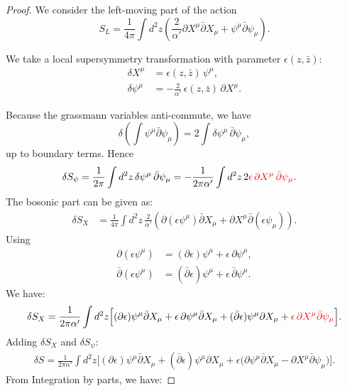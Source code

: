 \begin{tcolorbox}[breakable]
\begin{proof}
		We consider the left-moving part of the action
		\begin{equation}
			S_L=\frac{1}{4\pi}\int d^2z\left(\frac{2}{\alpha'}\partial X^\mu \bar\partial X_\mu+\psi^\mu\bar\partial\psi_\mu\right).
		\end{equation}
		
		We take a local supersymmetry transformation with parameter $\epsilon(z,\bar z)$:
		\begin{align}
			\delta X^\mu &= \epsilon(z,\bar z)\,\psi^\mu, \\
			\delta \psi^\mu &= -\frac{2}{\alpha'}\,\epsilon(z,\bar z)\,\partial X^\mu.
		\end{align}

		Because the grassmann variables anti-commute, we have
		\begin{equation}
			\delta\!\left(\int \psi^\mu \bar\partial \psi_\mu\right)
			= 2 \int \delta\psi^\mu\,\bar\partial \psi_\mu,
		\end{equation}
		up to boundary terms. Hence
		\begin{align}
			\delta S_\psi
			&= \frac{1}{2\pi}\int d^2z\, \delta\psi^\mu\,\bar\partial \psi_\mu= -\frac{1}{2\pi\alpha'}\int d^2z\, 2\mathcolor{red}{\epsilon\,\partial X^\mu\,\bar\partial \psi_\mu}.
		\end{align}
		The bosonic part can be given as:
		\begin{align}
			\delta S_X
			&= \frac{1}{4\pi}\int d^2z\,\frac{2}{\alpha'}
			\left(\partial(\epsilon\psi^\mu)\bar\partial X_\mu + \partial X^\mu \bar\partial(\epsilon\psi_\mu)\right).
		\end{align}
		Using
		\begin{align}
			\partial(\epsilon\psi^\mu) &= (\partial \epsilon)\psi^\mu + \epsilon\,\partial \psi^\mu, \\
			\bar\partial(\epsilon\psi^\mu) &= (\bar\partial \epsilon)\psi^\mu + \epsilon\,\bar\partial \psi^\mu.
		\end{align}
		We have:
		\begin{align}
			\delta S_X
			= \frac{1}{2\pi\alpha'}\int d^2z \Big[
			(\partial\epsilon)\psi^\mu\bar\partial X_\mu
			+ \epsilon\,\partial\psi^\mu\bar\partial X_\mu + (\bar\partial\epsilon)\psi^\mu\partial X_\mu
			+\mathcolor{red}{ \epsilon\,\partial X^\mu\bar\partial\psi_\mu}
			\Big].
		\end{align}
		Adding $\delta S_X$ and $\delta S_\psi$:
		\begin{align}
			\delta S
			= \frac{1}{2\pi\alpha'}\int d^2z \Big[
			(\partial\epsilon)\psi^\mu\bar\partial X_\mu
			+ (\bar\partial\epsilon)\psi^\mu\partial X_\mu  + \epsilon\big(\partial\psi^\mu\bar\partial X_\mu - \partial X^\mu\bar\partial\psi_\mu\big)
			\Big].
		\end{align}
		From Integration by parts, we have:
		

\end{proof}
\end{tcolorbox}
